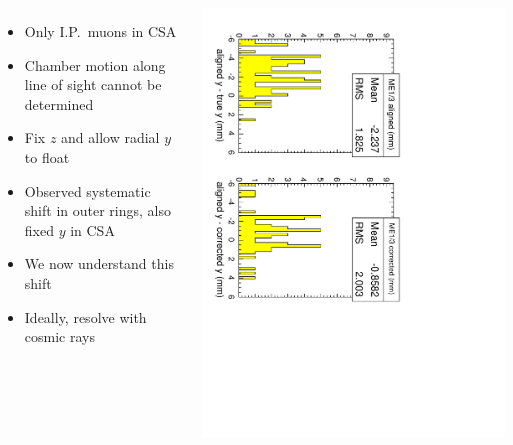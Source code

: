 \documentclass[compress]{beamer}
\begin{document}
\begin{frame}
\begin{columns}

\small
\begin{itemize}\setlength{\itemsep}{-0.02 cm}
\item Only I.P.\ muons in CSA
\item Chamber motion along line of sight cannot be determined
\item Fix $z$ and allow radial $y$ to float
\item Observed systematic shift in outer rings, also fixed $y$ in CSA
\item We now understand this shift
\item Ideally, resolve with cosmic rays
\end{itemize}

\includegraphics[height=\linewidth, angle=90]{corrected_me13y.pdf}

\end{columns}
\end{frame}
\end{document}
